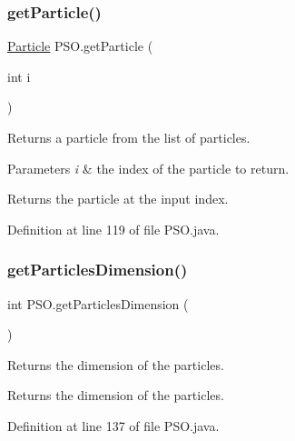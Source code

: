 \mbox{\label{class_p_s_o_a3c697a11238d768ae2b1236d3cf6ea88}} 
\subsubsection{\texorpdfstring{get\+Particle()}{getParticle()}}
{\footnotesize\ttfamily \hyperlink{class_particle}{Particle} P\+S\+O.\+get\+Particle (\begin{DoxyParamCaption}\item[{int}]{i }\end{DoxyParamCaption})}

Returns a particle from the list of particles. 
\begin{DoxyParams}{Parameters}
{\em i} & the index of the particle to return. \\
\hline
\end{DoxyParams}
\begin{DoxyReturn}{Returns}
the particle at the input index. 
\end{DoxyReturn}


Definition at line 119 of file P\+S\+O.\+java.

\mbox{\label{class_p_s_o_a46ddfeb9df3a42b2f1b2c4fe0d8f51b2}} 
\subsubsection{\texorpdfstring{get\+Particles\+Dimension()}{getParticlesDimension()}}
{\footnotesize\ttfamily int P\+S\+O.\+get\+Particles\+Dimension (\begin{DoxyParamCaption}{ }\end{DoxyParamCaption})}

Returns the dimension of the particles. \begin{DoxyReturn}{Returns}
the dimension of the particles. 
\end{DoxyReturn}


Definition at line 137 of file P\+S\+O.\+java.

\mbox{\label{class_p_s_o_a9ddf1bc2e611d1959fe4f6fdef960b0e}} 
